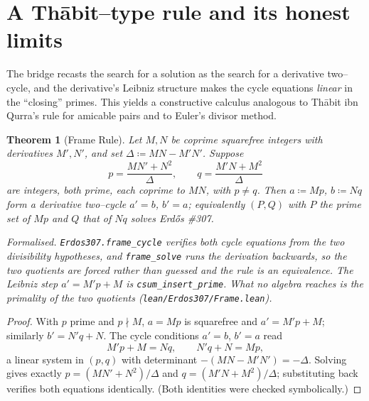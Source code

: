\documentclass[11pt]{article}
\newtheorem{theorem}{Theorem}[section]
\theoremstyle{definition}
\begin{document}
\section{A Th\=abit--type rule and its honest limits}\label{sec:frame}

The bridge recasts the search for a solution as the search for a derivative two--cycle, and the
derivative's Leibniz structure makes the cycle equations \emph{linear} in the ``closing'' primes.
This yields a constructive calculus analogous to Th\=abit ibn Qurra's rule for amicable pairs and to
Euler's divisor method.

\begin{theorem}[Frame Rule]\label{thm:frame}
Let $M,N$ be coprime squarefree integers with derivatives $M',N'$, and set $\Delta\coloneqq MN-M'N'$.
Suppose
\[
p=\frac{MN'+N^2}{\Delta},\qquad q=\frac{M'N+M^2}{\Delta}
\]
are integers, both prime, each coprime to $MN$, with $p\ne q$. Then $a\coloneqq Mp$, $b\coloneqq Nq$
form a derivative two--cycle $a'=b$, $b'=a$; equivalently $(P,Q)$ with $P$ the prime set of $Mp$ and
$Q$ that of $Nq$ solves Erd\H{o}s \#307.

\textup{Formalised.} \texttt{Erdos307.frame\_cycle} verifies both cycle equations from the two
divisibility hypotheses, and \texttt{frame\_solve} runs the derivation backwards, so the two
quotients are \emph{forced} rather than guessed and the rule is an equivalence. The Leibniz step
$a'=M'p+M$ is \texttt{csum\_insert\_prime}. What no algebra reaches is the primality of the two
quotients \textup{(\texttt{lean/Erdos307/Frame.lean})}.
\end{theorem}

\begin{proof}
With $p$ prime and $p\nmid M$, $a=Mp$ is squarefree and $a'=M'p+M$; similarly $b'=N'q+N$. The cycle
conditions $a'=b$, $b'=a$ read
\[
M'p+M=Nq,\qquad N'q+N=Mp,
\]
a linear system in $(p,q)$ with determinant $-(MN-M'N')=-\Delta$. Solving gives exactly
$p=(MN'+N^2)/\Delta$ and $q=(M'N+M^2)/\Delta$; substituting back verifies both equations
identically. (Both identities were checked symbolically.)
\end{proof}
\end{document}
